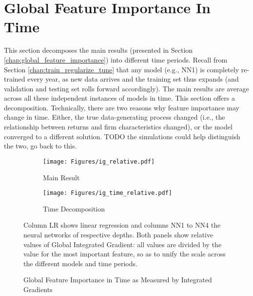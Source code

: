\section{Global Feature Importance In Time}

	This section decomposes the main results (presented in Section \ref{chap:global_feature_importance}) into different time periods. Recall from Section \ref{chap:train_regularize_tune} that any model (e.g., NN1) is completely re-trained every year, as new data arrives and the training set thus expands (and validation and testing set rolls forward accordingly). The main results are average across all these independent instances of models in time. This section offers a decomposition. Technically, there are two reasons why feature importance may change in time. Either, the true data-generating process changed (i.e., the relationship between returns and firm characteristics changed), or the model converged to a different solution. TODO the simulations could help distinguish the two, go back to this. 

	\begin{figure}	
		\centering		
		\begin{subfigure}[t]{\textwidth}
			\texttt{[image: Figures/ig\_relative.pdf]}
			\caption{Main Result}
			\label{fig:ig_time_main}
		\end{subfigure}
		
		\begin{subfigure}[t]{\textwidth}
			\centering
			\texttt{[image: Figures/ig\_time\_relative.pdf]}
			\caption{Time Decomposition}
			\label{fig:ig_time_relative}
		\end{subfigure}
		\caption{Global Feature Importance in Time as Measured by Integrated Gradients}
		\label{fig:ig_time}
		\medskip
		\small
		Column LR shows linear regression and columns NN1 to NN4 the neural networks of respective depths. Both panels show relative values of Global Integrated Gradient: all values are divided by the value for the most important feature, so as to unify the scale across the different models and time periods. 
	\end{figure}

